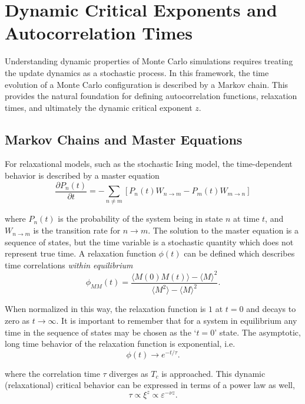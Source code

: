 \section{Dynamic Critical Exponents and Autocorrelation Times}

Understanding dynamic properties of Monte Carlo simulations requires treating the update dynamics as a stochastic process. In this framework, the time evolution of a Monte Carlo configuration is described by a Markov chain. This provides the natural foundation for defining autocorrelation functions, relaxation times, and ultimately the dynamic critical exponent $z$.


\subsection{Markov Chains and Master Equations}

For relaxational models, such as the stochastic Ising model, the time-dependent
behavior is described by a master equation
\begin{equation}
\frac{\partial P_n(t)}{\partial t}
= - \sum_{n \neq m} \left[ P_n(t) W_{n \to m} - P_m(t) W_{m \to n} \right]
\end{equation}

where $P_n(t)$ is the probability of the system being in state $n$ at time $t$,
and $W_{n \to m}$ is the transition rate for $n \to m$.
The solution to the master equation is a sequence of states, but the time variable
is a stochastic quantity which does not represent true time.
A relaxation function $\phi(t)$ can be defined which describes time correlations
\emph{within equilibrium}
\begin{equation}
\phi_{MM}(t)
= \frac{\langle M(0)M(t)\rangle - \langle M \rangle^2}
{\langle M^2 \rangle - \langle M \rangle^2}.
\end{equation}

When normalized in this way, the relaxation function is $1$ at $t = 0$ and
decays to zero as $t \to \infty$. It is important to remember that for a system
in equilibrium any time in the sequence of states may be chosen as the
`$t=0$' state. The asymptotic, long time behavior of the relaxation function
is exponential, i.e.
\begin{equation}
\phi(t) \to e^{-t/\tau}.
\end{equation}

where the correlation time $\tau$ diverges as $T_c$ is approached. This
dynamic (relaxational) critical behavior can be expressed in terms of
a power law as well,
\begin{equation}
\tau \propto \xi^{z} \propto \varepsilon^{-\nu z}.
\end{equation}

